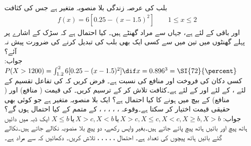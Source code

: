 \quad
بلب کی عرصہ زندگی  بلا منصوبہ متغیر ہے جس کی کثافت
\begin{align*}
f(x)=6[0.25-(x-1.5)^2]\quad \quad 1\le x\le 2
\end{align*}
 اور باقی  کے لئے  ہے، جہاں  سے مراد  گھنٹے ہیں۔ کیا احتمال ہے کہ سڑک کے اشارے پر پہلے  گھنٹوں میں تین میں سے کسی ایک بھی بلب کی تبدیل کرنے کی ضرورت پیش نہ آئے؟\\
جواب:\quad
$P(X>1200)=\int_{1.2}^{2}6[0.25-(x-1.5)^2]\dif x=0.896^3=\SI{72}{\percent}$
\quad
کسی دکان کی فروخت اور منافع کی نسبت   ہے۔ فرض کریں کہ  کی تفاعل تقسیم  کے لئے ،  کے لئے  اور  کے لئے  ہے۔کثافت تلاش کر کے ترسیم کریں۔ کی  قیمت  ( منافع) اور  ( منافع) کے بیچ میں ہونے کا کیا احتمال ہے؟  
\quad
{} ایک بلا منصوبہ متغیر ہے جو کوئی بھی حقیقی قیمت اختیار کر سکتا ہے۔وقوعہ ، ، ، ، ،  کے متمم کے کیا احتمال ہوں گے؟\\
جواب:\quad
$X\le b \,\text{یا} \,X>c,X<b \,\text{یا} \, X>c,X\le c,X<c,X\ge b,X>b$
\quad
ایک ڈبہ میں  دائیں ہاتھ پیچ اور  بائیں ہاتھ پیچ پائے جاتے ہیں۔بغیر واپس رکھے، دو پیچ بلا منصوبہ نکالے جاتے ہیں۔نکالے گئے بائیں ہاتھ پیچوں کی تعداد  ہے۔ احتمال ، ،  ، ، ، تلاش کریں۔
\quad
دکھائیں کہ  سے مراد  ہے۔

